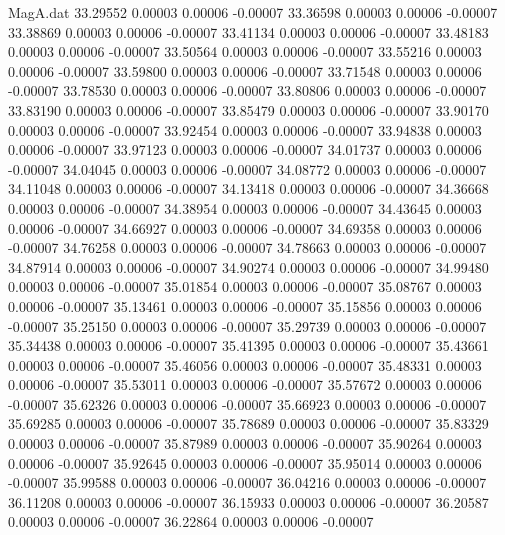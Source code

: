 \begin{filecontents}{MagA.dat}
  33.29552    0.00003    0.00006   -0.00007
  33.36598    0.00003    0.00006   -0.00007
  33.38869    0.00003    0.00006   -0.00007
  33.41134    0.00003    0.00006   -0.00007
  33.48183    0.00003    0.00006   -0.00007
  33.50564    0.00003    0.00006   -0.00007
  33.55216    0.00003    0.00006   -0.00007
  33.59800    0.00003    0.00006   -0.00007
  33.71548    0.00003    0.00006   -0.00007
  33.78530    0.00003    0.00006   -0.00007
  33.80806    0.00003    0.00006   -0.00007
  33.83190    0.00003    0.00006   -0.00007
  33.85479    0.00003    0.00006   -0.00007
  33.90170    0.00003    0.00006   -0.00007
  33.92454    0.00003    0.00006   -0.00007
  33.94838    0.00003    0.00006   -0.00007
  33.97123    0.00003    0.00006   -0.00007
  34.01737    0.00003    0.00006   -0.00007
  34.04045    0.00003    0.00006   -0.00007
  34.08772    0.00003    0.00006   -0.00007
  34.11048    0.00003    0.00006   -0.00007
  34.13418    0.00003    0.00006   -0.00007
  34.36668    0.00003    0.00006   -0.00007
  34.38954    0.00003    0.00006   -0.00007
  34.43645    0.00003    0.00006   -0.00007
  34.66927    0.00003    0.00006   -0.00007
  34.69358    0.00003    0.00006   -0.00007
  34.76258    0.00003    0.00006   -0.00007
  34.78663    0.00003    0.00006   -0.00007
  34.87914    0.00003    0.00006   -0.00007
  34.90274    0.00003    0.00006   -0.00007
  34.99480    0.00003    0.00006   -0.00007
  35.01854    0.00003    0.00006   -0.00007
  35.08767    0.00003    0.00006   -0.00007
  35.13461    0.00003    0.00006   -0.00007
  35.15856    0.00003    0.00006   -0.00007
  35.25150    0.00003    0.00006   -0.00007
  35.29739    0.00003    0.00006   -0.00007
  35.34438    0.00003    0.00006   -0.00007
  35.41395    0.00003    0.00006   -0.00007
  35.43661    0.00003    0.00006   -0.00007
  35.46056    0.00003    0.00006   -0.00007
  35.48331    0.00003    0.00006   -0.00007
  35.53011    0.00003    0.00006   -0.00007
  35.57672    0.00003    0.00006   -0.00007
  35.62326    0.00003    0.00006   -0.00007
  35.66923    0.00003    0.00006   -0.00007
  35.69285    0.00003    0.00006   -0.00007
  35.78689    0.00003    0.00006   -0.00007
  35.83329    0.00003    0.00006   -0.00007
  35.87989    0.00003    0.00006   -0.00007
  35.90264    0.00003    0.00006   -0.00007
  35.92645    0.00003    0.00006   -0.00007
  35.95014    0.00003    0.00006   -0.00007
  35.99588    0.00003    0.00006   -0.00007
  36.04216    0.00003    0.00006   -0.00007
  36.11208    0.00003    0.00006   -0.00007
  36.15933    0.00003    0.00006   -0.00007
  36.20587    0.00003    0.00006   -0.00007
  36.22864    0.00003    0.00006   -0.00007

\end{filecontents}
